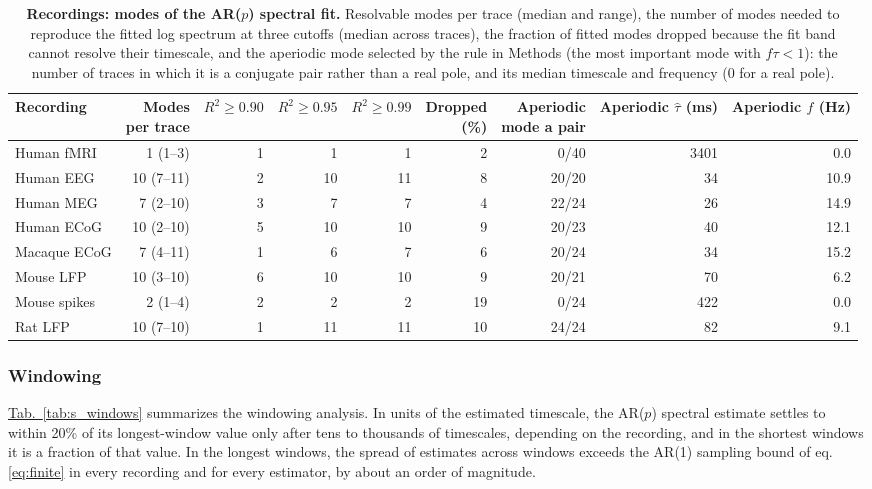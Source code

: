 \documentclass[pdflatex,lineno,sn-nature]{sn-jnl}
\newcommand{\tabpanel}[2][]{\hyperref[#2]{Tab.~#1\ref*{#2}}}
\theoremstyle{thmstyleone}
\theoremstyle{thmstyletwo}
\theoremstyle{thmstylethree}
\begin{document}
\begin{table}[h]
\caption{\textbf{Recordings: modes of the AR($p$) spectral fit.} Resolvable modes per trace (median and range), the number of modes needed to reproduce the fitted log spectrum at three cutoffs (median across traces), the fraction of fitted modes dropped because the fit band cannot resolve their timescale, and the aperiodic mode selected by the rule in Methods (the most important mode with $f\tau < 1$): the number of traces in which it is a conjugate pair rather than a real pole, and its median timescale and frequency (0 for a real pole).}\label{tab:s_modes}
\setlength{\tabcolsep}{3pt}
\begin{tabular}{lrrrrrrrr}
\toprule
Recording & \shortstack[c]{Modes \\ per trace} & $R^2 \ge 0.90$ & $R^2 \ge 0.95$ & $R^2 \ge 0.99$ & \shortstack[c]{Dropped \\ (\%)} & \shortstack[c]{Aperiodic \\ mode a pair} & \shortstack[c]{Aperiodic \\ $\hat\tau$ (ms)} & \shortstack[c]{Aperiodic \\ $f$ (Hz)} \\
\midrule
Human fMRI & 1 (1--3) & 1 & 1 & 1 & 2 & 0/40 & 3401 & 0.0 \\
Human EEG & 10 (7--11) & 2 & 10 & 11 & 8 & 20/20 & 34 & 10.9 \\
Human MEG & 7 (2--10) & 3 & 7 & 7 & 4 & 22/24 & 26 & 14.9 \\
Human ECoG & 10 (2--10) & 5 & 10 & 10 & 9 & 20/23 & 40 & 12.1 \\
Macaque ECoG & 7 (4--11) & 1 & 6 & 7 & 6 & 20/24 & 34 & 15.2 \\
Mouse LFP & 10 (3--10) & 6 & 10 & 10 & 9 & 20/21 & 70 & 6.2 \\
Mouse spikes & 2 (1--4) & 2 & 2 & 2 & 19 & 0/24 & 422 & 0.0 \\
Rat LFP & 10 (7--10) & 1 & 11 & 11 & 10 & 24/24 & 82 & 9.1 \\
\bottomrule
\end{tabular}
\end{table}

\subsubsection*{Windowing}

\tabpanel{tab:s_windows} summarizes the windowing analysis. In units of the estimated timescale, the AR($p$) spectral estimate settles to within 20\% of its longest-window value only after tens to thousands of timescales, depending on the recording, and in the shortest windows it is a fraction of that value. In the longest windows, the spread of estimates across windows exceeds the AR(1) sampling bound of eq. \ref{eq:finite} in every recording and for every estimator, by about an order of magnitude.
\end{document}
